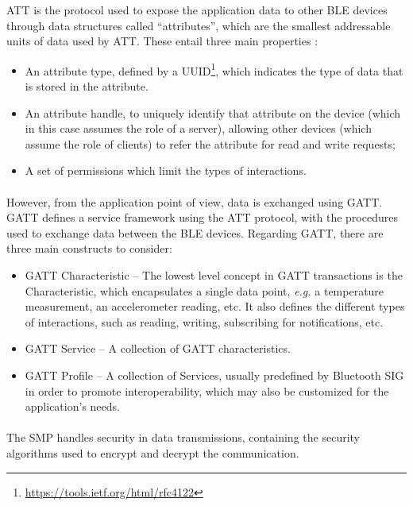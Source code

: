 \acs{ATT} is the protocol used to expose the application data to other \acs{BLE} devices through data structures called ``attributes'', which are the smallest addressable units of data used by \acs{ATT}. These entail three main properties \cite{Specification1999}: 

\begin{itemize}
    \item An attribute type, defined by a \acf{UUID}\footnote{\url{https://tools.ietf.org/html/rfc4122}}, which indicates the type of data that is stored in the attribute.
    \item An attribute handle, to uniquely identify that attribute on the device (which in this case assumes the role of a server), allowing other devices (which assume the role of clients) to refer the attribute for read and write requests;
    \item A set of permissions which limit the types of interactions.
\end{itemize}

\paragraph{} However, from the application point of view, data is exchanged using \acf{GATT}. \acs{GATT} defines a service framework using the \acs{ATT} protocol, with the procedures used to exchange data between the \acs{BLE} devices. Regarding \acs{GATT}, there are three main constructs to consider:

\begin{itemize}
    \item \acs{GATT} Characteristic -- The lowest level concept in \acs{GATT} transactions is the Characteristic, which encapsulates a single data point, \textit{e.g.} a temperature measurement, an accelerometer reading, etc. It also defines the different types of interactions, such as reading, writing, subscribing for notifications, etc.
    \item \acs{GATT} Service -- A collection of \acs{GATT} characteristics.
    \item \acs{GATT} Profile -- A collection of Services, usually predefined by Bluetooth \acf{SIG} in order to promote interoperability, which may also be customized for the application's needs.
\end{itemize}

\paragraph{} The \acf{SMP} handles security in data transmissions, containing the security algorithms used to encrypt and decrypt the communication. %

